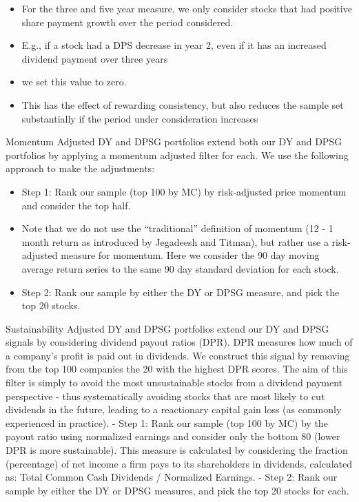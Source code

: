\documentclass[12pt,preprint, authoryear]{elsarticle}
\numberwithin{equation}{section}
\numberwithin{figure}{section}
\numberwithin{table}{section}
\def\tightlist{} %
\begin{document}
\begin{itemize}
\tightlist
\item
  For the three and five year measure, we only consider stocks that had
  positive share payment growth over the period considered.
\item
  E.g., if a stock had a DPS decrease in year 2, even if it has an
  increased dividend payment over three years
\item
  we set this value to zero.
\item
  This has the effect of rewarding consistency, but also reduces the
  sample set substantially if the period under consideration increases
\end{itemize}

Momentum Adjusted DY and DPSG portfolios extend both our DY and DPSG
portfolios by applying a momentum adjusted filter for each. We use the
following approach to make the adjustments:

\begin{itemize}
\tightlist
\item
  Step 1: Rank our sample (top 100 by MC) by risk-adjusted price
  momentum and consider the top half.
\item
  Note that we do not use the ``traditional'' definition of momentum (12
  - 1 month return as introduced by Jegadeesh and Titman), but rather
  use a risk-adjusted measure for momentum. Here we consider the 90 day
  moving average return series to the same 90 day standard deviation for
  each stock.
\item
  Step 2: Rank our sample by either the DY or DPSG measure, and pick the
  top 20 stocks.
\end{itemize}

Sustainability Adjusted DY and DPSG portfolios extend our DY and DPSG
signals by considering dividend payout ratios (DPR). DPR measures how
much of a company's profit is paid out in dividends. We construct this
signal by removing from the top 100 companies the 20 with the highest
DPR scores. The aim of this filter is simply to avoid the most
unsustainable stocks from a dividend payment perspective - thus
systematically avoiding stocks that are most likely to cut dividends in
the future, leading to a reactionary capital gain loss (as commonly
experienced in practice). - Step 1: Rank our sample (top 100 by MC) by
the payout ratio using normalized earnings and consider only the bottom
80 (lower DPR is more sustainable). This measure is calculated by
considering the fraction (percentage) of net income a firm pays to its
shareholders in dividends, calculated as: Total Common Cash Dividends /
Normalized Earnings. - Step 2: Rank our sample by either the DY or DPSG
measures, and pick the top 20 stocks for each.
\end{document}
